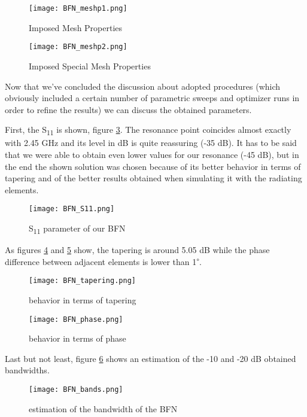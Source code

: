 \begin{figure}[H]
\centering
\texttt{[image: BFN\_meshp1.png]}
\caption{Imposed Mesh Properties}
\label{BFN_meshp1}
\end{figure}

\begin{figure}[H]
\centering
\texttt{[image: BFN\_meshp2.png]}
\caption{Imposed Special Mesh Properties}
\label{BFN_meshp2}
\end{figure}

\par\medskip
\noindent
Now that we've concluded the discussion about adopted procedures (which obviously included a certain number of parametric sweeps and optimizer runs in order to refine the results) we can discuss the obtained parameters.

\par\medskip
\noindent
First, the S\textsubscript{11} is shown, figure \ref{BFN_S11}. The resonance point coincides almost exactly with 2.45 GHz and its level in dB is quite reassuring (-35 dB). It has to be said that we were able to obtain even lower values for our resonance (-45 dB), but in the end the shown solution was chosen because of its better behavior in terms of tapering and of the better results obtained when simulating it with the radiating elements.

\begin{figure}[H]
\centering
\texttt{[image: BFN\_S11.png]}
\caption{S\textsubscript{11} parameter of our BFN}
\label{BFN_S11}
\end{figure}

\par\medskip
\noindent
As figures \ref{BFN_tapering} and \ref{BFN_phase} show, the tapering is around 5.05 dB while the phase difference between adjacent elements is lower than 1\textsuperscript{$\circ$}.

\begin{figure}[H]
\centering
\texttt{[image: BFN\_tapering.png]}
\caption{behavior in terms of tapering}
\label{BFN_tapering}
\end{figure}

\begin{figure}[H]
\centering
\texttt{[image: BFN\_phase.png]}
\caption{behavior in terms of phase}
\label{BFN_phase}
\end{figure}

\par\medskip
\noindent
Last but not least, figure \ref{BFN_bands} shows an estimation of the -10 and -20 dB obtained bandwidths.

\begin{figure}[H]
\centering
\texttt{[image: BFN\_bands.png]}
\caption{estimation of the bandwidth of the BFN}
\label{BFN_bands}
\end{figure}